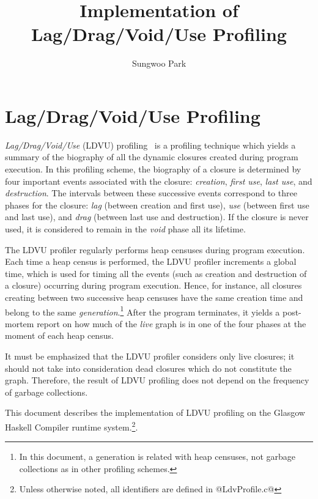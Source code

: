 \documentclass{article}
\begin{document}
\title{Implementation of Lag/Drag/Void/Use Profiling}
\author{Sungwoo Park}

\makeatactive
\maketitle

\section{Lag/Drag/Void/Use Profiling}

\emph{Lag/Drag/Void/Use} (LDVU) profiling~\cite{RR} is a profiling technique 
which yields a summary of the biography of all the dynamic closures created
during program execution.
In this profiling scheme,
the biography of a closure is determined by four important events associated
with the closure: \emph{creation}, \emph{first use}, 
\emph{last use}, and \emph{destruction}.
The intervals between these successive events correspond to three phases
for the closure: \emph{lag} (between creation and first use), 
\emph{use} (between first use and last use), and 
\emph{drag} (between last use and destruction).
If the closure is never used, it is considered to remain in the \emph{void}
phase all its lifetime.

The LDVU profiler regularly performs heap censuses during program execution.
Each time a heap census is performed, the LDVU profiler increments a global
time, which is used for timing all the events (such as creation and destruction
of a closure) occurring during program execution.
Hence, for instance, all closures creating between two successive heap censuses
have the same creation time and belong to the same \emph{generation}.\footnote{In
this document, a generation is related with heap censuses, not garbage collections
as in other profiling schemes.}
After the program terminates, it yields a post-mortem report on how much 
of the \emph{live} graph is in one of the four phases at the moment of each 
heap census.

It must be emphasized that the LDVU profiler considers only live closures;
it should not take into consideration dead closures which do not constitute
the graph. Therefore, the result of LDVU profiling does not depend on the
frequency of garbage collections.

This document describes the implementation of LDVU profiling on the Glasgow
Haskell Compiler runtime system.\footnote{Unless otherwise noted, all identifiers
are defined in @LdvProfile.c@}.
\end{document}
